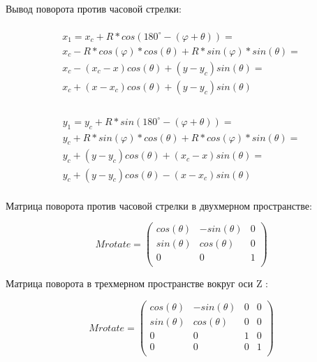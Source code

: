 Вывод поворота против часовой стрелки:

\begin{multline}
	\\
	x_1 = x_c + R*cos(180^{\circ}-(\varphi +  \theta)) = \\
	x_c - R*cos(\varphi)*cos(\theta) + R*sin(\varphi)*sin(\theta) = \\
	x_c - (x_c - x)cos(\theta) + (y - y_c)sin(\theta) = \\
	x_c + (x - x_c)cos(\theta) + (y - y_c)sin(\theta) \\
\end{multline}

\begin{multline}
	\\
	y_1 = y_c + R*sin(180^{\circ}-(\varphi +  \theta)) = \\
	y_c + R*sin(\varphi)*cos(\theta) + R*cos(\varphi)*sin(\theta) = \\
	y_c + (y - y_c)cos(\theta) + (x_c- x)sin(\theta) = \\
	y_c + (y - y_c)cos(\theta) - (x - x_c)sin(\theta) \\
\end{multline}

Матрица поворота против часовой стрелки в двухмерном пространстве:

\begin{equation}
	Mrotate = \left(
	\begin{array}{cccc}
			cos(\theta) & -sin(\theta) & 0 \\
			sin(\theta) & cos(\theta)  & 0 \\
			0           & 0            & 1 \\
		\end{array}
	\right)
\end{equation}

Матрица поворота в трехмерном пространстве вокруг оси Z :

\begin{equation}
	Mrotate = \left(
	\begin{array}{cccc}
			cos(\theta) & -sin(\theta) & 0 & 0 \\
			sin(\theta) & cos(\theta)  & 0 & 0 \\
			0           & 0            & 1 & 0 \\
			0           & 0            & 0 & 1 \\
		\end{array}
	\right)
\end{equation}

